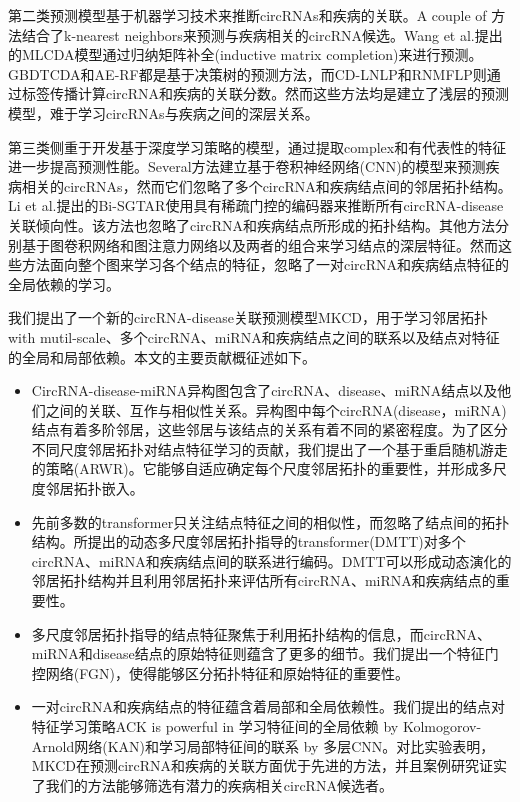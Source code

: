 \documentclass{bioinfo}
\begin{document}
\begin{methods}
第二类预测模型基于机器学习技术来推断circRNAs和疾病的关联。A couple of 方法结合了k-nearest neighbors来预测与疾病相关的circRNA候选\cite{wang2022combining,lei2020integrating,yan2018dwnn}。Wang et al.提出的MLCDA模型通过归纳矩阵补全(inductive matrix completion)来进行预测\cite{wang2022machine}。GBDTCDA和AE-RF都是基于决策树的预测方法\cite{lei2019gbdtcda,deepthi2021inferring}，而CD-LNLP和RNMFLP则通过标签传播计算circRNA和疾病的关联分数\cite{zhang2019predicting,peng2022rnmflp}。然而这些方法均是建立了浅层的预测模型，难于学习circRNAs与疾病之间的深层关系。

第三类侧重于开发基于深度学习策略的模型，通过提取complex和有代表性的特征进一步提高预测性能。Several方法建立基于卷积神经网络(CNN)的模型来预测疾病相关的circRNAs\cite{tian2024mamlcda,wang2020efficient,lu2020improving}，然而它们忽略了多个circRNA和疾病结点间的邻居拓扑结构。Li et al.提出的Bi-SGTAR使用具有稀疏门控的编码器来推断所有circRNA-disease关联倾向性\cite{li2024bi}。该方法也忽略了circRNA和疾病结点所形成的拓扑结构。其他方法分别基于图卷积网络\cite{shang2024sgfccda,liu2023mpclcda,wu2022mdgf}和图注意力网络\cite{wu2023mlngcf}以及两者的组合\cite{dai2022graphcda}来学习结点的深层特征。然而这些方法面向整个图来学习各个结点的特征，忽略了一对circRNA和疾病结点特征的全局依赖的学习。

我们提出了一个新的circRNA-disease关联预测模型MKCD，用于学习邻居拓扑with mutil-scale、多个circRNA、miRNA和疾病结点之间的联系以及结点对特征的全局和局部依赖。本文的主要贡献概征述如下。
\begin{itemize}
    \item CircRNA-disease-miRNA异构图包含了circRNA、disease、miRNA结点以及他们之间的关联、互作与相似性关系。异构图中每个circRNA(disease，miRNA)结点有着多阶邻居，这些邻居与该结点的关系有着不同的紧密程度。为了区分不同尺度邻居拓扑对结点特征学习的贡献，我们提出了一个基于重启随机游走的策略(ARWR)。它能够自适应确定每个尺度邻居拓扑的重要性，并形成多尺度邻居拓扑嵌入。
    \item 先前多数的transformer只关注结点特征之间的相似性，而忽略了结点间的拓扑结构。所提出的动态多尺度邻居拓扑指导的transformer(DMTT)对多个circRNA、miRNA和疾病结点间的联系进行编码。DMTT可以形成动态演化的邻居拓扑结构并且利用邻居拓扑来评估所有circRNA、miRNA和疾病结点的重要性。
    \item 多尺度邻居拓扑指导的结点特征聚焦于利用拓扑结构的信息，而circRNA、miRNA和disease结点的原始特征则蕴含了更多的细节。我们提出一个特征门控网络(FGN)，使得能够区分拓扑特征和原始特征的重要性。
    \item 一对circRNA和疾病结点的特征蕴含着局部和全局依赖性。我们提出的结点对特征学习策略ACK is powerful in 学习特征间的全局依赖 by Kolmogorov-Arnold网络(KAN)\cite{liu2024kan}和学习局部特征间的联系 by 多层CNN。对比实验表明，MKCD在预测circRNA和疾病的关联方面优于先进的方法，并且案例研究证实了我们的方法能够筛选有潜力的疾病相关circRNA候选者。
\end{itemize}




\end{methods}
\end{document}
